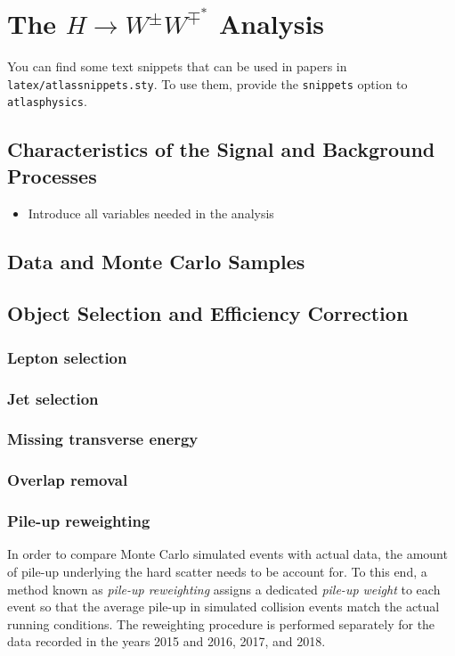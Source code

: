 \chapter{The $H\rightarrow W^{\pm}W^{\mp^*}$ Analysis}
\label{chap:hww}

You can find some text snippets that can be used in papers in \texttt{latex/atlassnippets.sty}.
To use them, provide the \texttt{snippets} option to \texttt{atlasphysics}.

\section{Characteristics of the Signal and Background Processes}
\begin{itemize}
    \item Introduce all variables needed in the analysis
\end{itemize}

\section{Data and Monte Carlo Samples}


\section{Object Selection and Efficiency Correction}
\subsection{Lepton selection}
\subsection{Jet selection}
\subsection{Missing transverse energy}
\subsection{Overlap removal}
\label{subsec:overlap-removal}

\subsection{Pile-up reweighting}
In order to compare Monte Carlo simulated events with actual data, the amount of pile-up underlying the hard scatter needs to be account for. 
To this end, a method known as \emph{pile-up reweighting} assigns a dedicated \emph{pile-up weight} to each event so that the average pile-up in simulated collision events match the actual running conditions. The reweighting procedure is performed separately for the data recorded in the years 2015 and 2016, 2017, and 2018.



